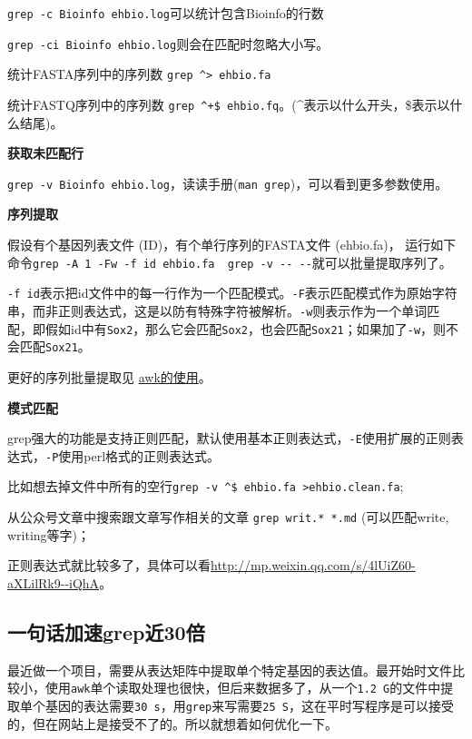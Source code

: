 \documentclass[]{article}
\numberwithin{figure}{section}
\numberwithin{table}{section}
\begin{document}
\texttt{grep\ -c\ \textquotesingle{}Bioinfo\textquotesingle{}\ ehbio.log}可以统计包含Bioinfo的行数

\texttt{grep\ -ci\ \textquotesingle{}Bioinfo\textquotesingle{}\ ehbio.log}则会在匹配时忽略大小写。

统计FASTA序列中的序列数 \texttt{grep\ \textquotesingle{}\^{}\textgreater{}\textquotesingle{}\ ehbio.fa}

统计FASTQ序列中的序列数 \texttt{grep\ \textquotesingle{}\^{}+\$\textquotesingle{}\ ehbio.fq}。(\^{}表示以什么开头，\$表示以什么结尾)。

\textbf{获取未匹配行}

\texttt{grep\ -v\ \textquotesingle{}Bioinfo\textquotesingle{}\ ehbio.log}，读读手册(\texttt{man\ grep})，可以看到更多参数使用。

\textbf{序列提取}

假设有个基因列表文件 (ID)，有个单行序列的FASTA文件 (ehbio.fa)， 运行如下命令\texttt{grep\ -A\ 1\ -Fw\ -f\ id\ ehbio.fa\ \textbar{}\ grep\ -v\ -\/-\ \textquotesingle{}-\/-\textquotesingle{}}就可以批量提取序列了。

\texttt{-f\ id}表示把id文件中的每一行作为一个匹配模式。\texttt{-F}表示匹配模式作为原始字符串，而非正则表达式，这是以防有特殊字符被解析。\texttt{-w}则表示作为一个单词匹配，即假如id中有\texttt{Sox2}，那么它会匹配\texttt{Sox2}，也会匹配\texttt{Sox21}；如果加了\texttt{-w}，则不会匹配\texttt{Sox21}。

更好的序列批量提取见 \href{http://mp.weixin.qq.com/s/R1OHRhZoDJuAdyVdJr2xHg}{awk的使用}。

\textbf{模式匹配}

grep强大的功能是支持正则匹配，默认使用基本正则表达式，\texttt{-E}使用扩展的正则表达式，\texttt{-P}使用perl格式的正则表达式。

比如想去掉文件中所有的空行\texttt{grep\ -v\ \textquotesingle{}\^{}\$\textquotesingle{}\ ehbio.fa\ \textgreater{}ehbio.clean.fa};

从公众号文章中搜索跟文章写作相关的文章 \texttt{grep\ \textquotesingle{}writ.*\textquotesingle{}\ *.md} (可以匹配write, writing等字)；

正则表达式就比较多了，具体可以看\url{http://mp.weixin.qq.com/s/4lUiZ60-aXLilRk9--iQhA}。

\hypertarget{grep_faster}{%
\subsection{一句话加速grep近30倍}\label{grep_faster}}

最近做一个项目，需要从表达矩阵中提取单个特定基因的表达值。最开始时文件比较小，使用\texttt{awk}单个读取处理也很快，但后来数据多了，从一个\texttt{1.2\ G}的文件中提取单个基因的表达需要\texttt{30\ s}，用\texttt{grep}来写需要\texttt{25\ S}，这在平时写程序是可以接受的，但在网站上是接受不了的。所以就想着如何优化一下。
\end{document}

